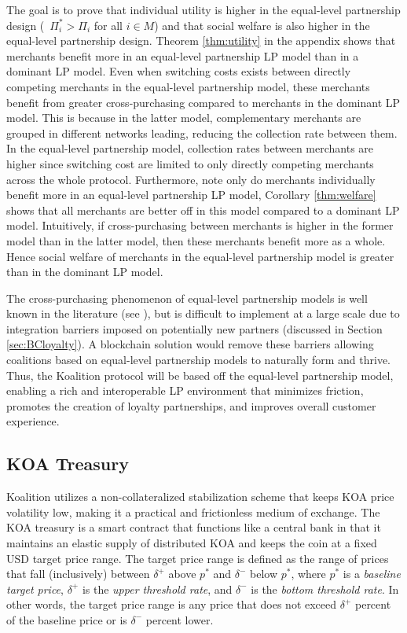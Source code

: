 The goal is to prove that individual utility is higher in the equal-level partnership design (\ie\ $\Pi_i^* > \Pi_i$ for all $i \in M$) and that social welfare is also higher in the equal-level partnership design. Theorem \ref{thm:utility} in the appendix shows that merchants benefit more in an equal-level partnership LP model than in a dominant LP model. Even when switching costs exists between directly competing merchants in the equal-level partnership model, these merchants benefit from greater cross-purchasing compared to merchants in the dominant LP model. This is because in the latter model, complementary merchants are grouped in different networks leading, reducing the collection rate between them. In the equal-level partnership model, collection rates between merchants are higher since switching cost are limited to only directly competing merchants across the whole protocol. Furthermore, note only do merchants individually benefit more in an equal-level partnership LP model, Corollary \ref{thm:welfare} shows that all merchants are better off in this model compared to a dominant LP model. Intuitively, if cross-purchasing between merchants is higher in the former model than in the latter model, then these merchants benefit more as a whole. Hence social welfare of merchants in the equal-level partnership model is greater than in the dominant LP model.

The cross-purchasing phenomenon of equal-level partnership models is well known in the literature (see \cite{Dorotic12}), but is difficult to implement at a large scale due to integration barriers imposed on potentially new partners (discussed in Section \ref{sec:BCloyalty}). A blockchain solution would remove these barriers allowing coalitions based on equal-level partnership models to naturally form and thrive. Thus, the Koalition protocol will be based off the equal-level partnership model, enabling a rich and interoperable LP environment that minimizes friction, promotes the creation of loyalty partnerships, and improves overall customer experience. 

\subsection{KOA Treasury}
Koalition utilizes a non-collateralized stabilization scheme that keeps KOA price volatility low, making it a practical and frictionless medium of exchange. The KOA treasury is a smart contract that functions like a central bank in that it maintains an elastic supply of distributed KOA and keeps the coin at a fixed USD target price range. The target price range is defined as the range of prices that fall (inclusively) between $\delta^+$ above $p^*$ and $\delta^-$ below $p^*$, where $p^*$ is a \textit{baseline target price}, $\delta^+$ is the \textit{upper threshold rate}, and $\delta^-$ is the \textit{bottom threshold rate}. In other words, the target price range is any price that does not exceed $\delta^+$ percent of the baseline price or is $\delta^-$ percent lower.

